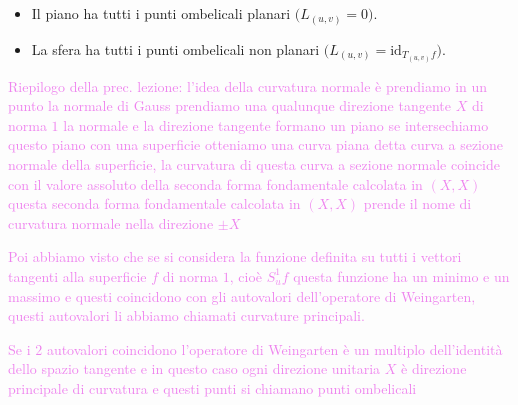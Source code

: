         \begin{esempio}
        \mbox{}

        \begin{itemize}
            \item Il piano ha tutti i punti ombelicali planari $\big(L_{(u,v)} = 0\big)$.
            \item La sfera ha tutti i punti ombelicali non planari $\big(L_{(u,v)} = \mathrm{id}_{T_{(u,v)}f}\big)$.
        \end{itemize}
        \end{esempio}
        \textcolor{violet}{Riepilogo della prec. lezione: l'idea della curvatura normale è prendiamo in un punto la normale di Gauss prendiamo una qualunque direzione tangente $X$ di norma $1$ 
        la normale e la direzione tangente formano un piano se intersechiamo questo piano con una superficie otteniamo una curva piana detta curva a sezione normale della
        superficie, la curvatura di questa curva a sezione normale coincide con il valore assoluto della seconda forma fondamentale calcolata in $(X,X)$
        questa seconda forma fondamentale calcolata in $(X,X)$ prende il nome di curvatura normale nella direzione $\pm X$}

        \textcolor{violet}{Poi abbiamo visto che se si considera la funzione definita su tutti i vettori tangenti alla superficie $f$ di norma $1$, cioè $S^1_uf$ questa
        funzione ha un minimo e un massimo e questi coincidono con gli autovalori dell'operatore di Weingarten, questi autovalori li abbiamo chiamati curvature principali.}

        \textcolor{violet}{Se i $2$ autovalori coincidono l'operatore di Weingarten è un multiplo dell'identità dello spazio tangente e in questo caso ogni direzione unitaria $X$ è 
        direzione principale di curvatura e questi punti si chiamano punti ombelicali}

